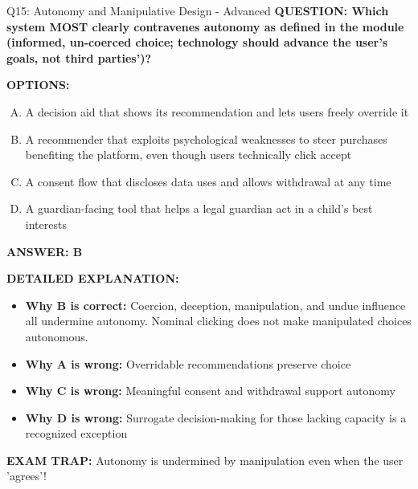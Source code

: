\documentclass[8pt]{beamer}
\begin{document}
\begin{frame}[shrink=6]{Q15: Autonomy and Manipulative Design - Advanced}
\fontsize{6.5}{7.5}\selectfont
\textbf{QUESTION: Which system MOST clearly contravenes autonomy as defined in the module (informed, un-coerced choice; technology should advance the user's goals, not third parties')?}

\vspace{0.1cm}
\textbf{OPTIONS:}
\begin{enumerate}[A.]
\item A decision aid that shows its recommendation and lets users freely override it
\item A recommender that exploits psychological weaknesses to steer purchases benefiting the platform, even though users technically click accept
\item A consent flow that discloses data uses and allows withdrawal at any time
\item A guardian-facing tool that helps a legal guardian act in a child's best interests
\end{enumerate}

\vspace{0.1cm}
\textcolor{myblue}{\textbf{ANSWER: B}}

\vspace{0.1cm}
\textbf{DETAILED EXPLANATION:}
\begin{itemize}
\item \textbf{Why B is correct:} Coercion, deception, manipulation, and undue influence all undermine autonomy. Nominal clicking does not make manipulated choices autonomous.
\item \textbf{Why A is wrong:} Overridable recommendations preserve choice
\item \textbf{Why C is wrong:} Meaningful consent and withdrawal support autonomy
\item \textbf{Why D is wrong:} Surrogate decision-making for those lacking capacity is a recognized exception
\end{itemize}

\textcolor{myred}{\textbf{EXAM TRAP:}} Autonomy is undermined by manipulation even when the user 'agrees'!
\end{frame}
\end{document}
